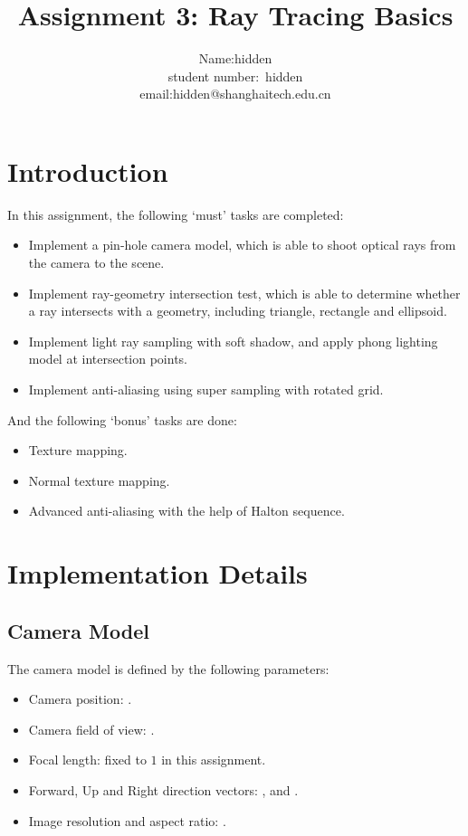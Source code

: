 \documentclass[acmtog]{acmart}
\title{Assignment 3: {Ray Tracing Basics}}
\author{Name:\quad hidden  \\ student number:\ hidden
\\email:\quad hidden@shanghaitech.edu.cn}
\begin{document}
\maketitle

\vspace*{2 ex}

\section{Introduction}

In this assignment, the following `must' tasks are completed:
\begin{itemize}
	\item Implement a pin-hole camera model, which is able to shoot optical rays from the camera to the scene.
	\item Implement ray-geometry intersection test, which is able to determine whether a ray intersects with a geometry, including triangle, rectangle and ellipsoid.
	\item Implement light ray sampling with soft shadow, and apply phong lighting model at intersection points.
	\item Implement anti-aliasing using super sampling with rotated grid.
\end{itemize}

And the following `bonus' tasks are done:
\begin{itemize}
	\item Texture mapping.
	\item Normal texture mapping.
	\item Advanced anti-aliasing with the help of Halton sequence.
\end{itemize}

\section{Implementation Details}

\subsection{Camera Model}

The camera model is defined by the following parameters:

\begin{itemize}
	\item Camera position: {\color{magenta}{pos}}.
	\item Camera field of view: {\color{magenta}{fov}}.
	\item Focal length: fixed to $1$ in this assignment.
	\item Forward, Up and Right direction vectors: {\color{magenta}{forward}}, {\color{magenta}{up}} and {\color{magenta}{right}}.
	\item Image resolution and aspect ratio: {\color{magenta}{image}}.
\end{itemize}
\end{document}
